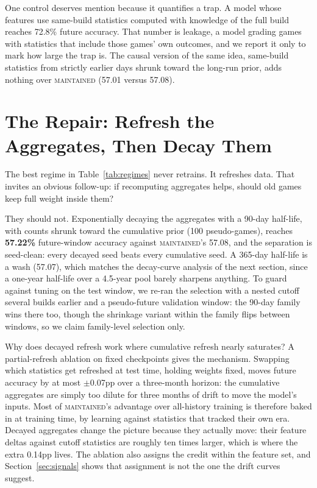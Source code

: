 \documentclass[journal]{IEEEtran}
\newcommand{\maintained}{\textsc{maintained}}          %
\begin{document}
One control deserves mention because it quantifies a trap. A model
whose features use same-build statistics computed with knowledge of the
full build reaches 72.8\% future accuracy. That number is leakage, a
model grading games with statistics that include those games' own
outcomes, and we report it only to mark how large the trap is. The
causal version of the same idea, same-build statistics from strictly
earlier days shrunk toward the long-run prior, adds nothing over
\maintained{} (57.01 versus 57.08).

\section{The Repair: Refresh the Aggregates, Then Decay Them}
\label{sec:repair}

The best regime in Table~\ref{tab:regimes} never retrains. It refreshes
data. That invites an obvious follow-up: if recomputing aggregates helps,
should old games keep full weight inside them?

They should not. Exponentially decaying the aggregates with a 90-day
half-life, with counts shrunk toward the cumulative prior (100
pseudo-games), reaches \textbf{57.22\%} future-window accuracy against
\maintained{}'s 57.08, and the separation is seed-clean: every decayed
seed beats every cumulative seed. A 365-day half-life is a wash (57.07),
which matches the decay-curve analysis of the next section, since a
one-year half-life over a 4.5-year pool barely sharpens anything. To
guard against tuning on the test window, we re-ran the selection with a
nested cutoff several builds earlier and a pseudo-future validation
window: the 90-day family wins there too, though the shrinkage variant
within the family flips between windows, so we claim family-level
selection only.

Why does decayed refresh work where cumulative refresh nearly saturates?
A partial-refresh ablation on fixed checkpoints gives the mechanism.
Swapping which statistics get refreshed at test time, holding weights
fixed, moves future accuracy by at most $\pm$0.07pp over a three-month
horizon: the cumulative aggregates are simply too dilute for three
months of drift to move the model's inputs. Most of \maintained{}'s
advantage over all-history training is therefore baked in at training
time, by learning against statistics that tracked their own era. Decayed
aggregates change the picture because they actually move: their feature
deltas against cutoff statistics are roughly ten times larger, which is
where the extra 0.14pp lives. The ablation also assigns the credit
within the feature set, and Section~\ref{sec:signals} shows that
assignment is not the one the drift curves suggest.
\end{document}
